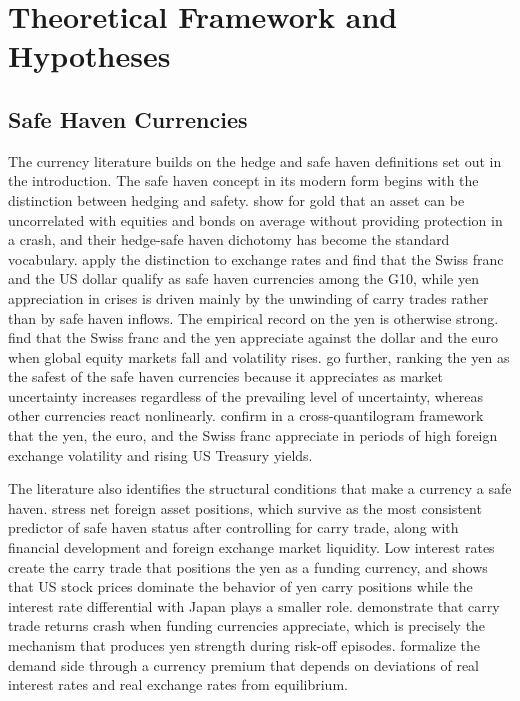 \section{Theoretical Framework and Hypotheses}

\subsection{Safe Haven Currencies}

The currency literature builds on the hedge and safe haven definitions set out in the introduction. The safe haven concept in its modern form begins with the distinction between hedging and safety. \textcite{baur_lucey_2010} show for gold that an asset can be uncorrelated with equities and bonds on average without providing protection in a crash, and their hedge-safe haven dichotomy has become the standard vocabulary. \textcite{hossfeld_macdonald_2014} apply the distinction to exchange rates and find that the Swiss franc and the US dollar qualify as safe haven currencies among the G10, while yen appreciation in crises is driven mainly by the unwinding of carry trades rather than by safe haven inflows. The empirical record on the yen is otherwise strong. \textcite{ranaldo_soderlind_2010} find that the Swiss franc and the yen appreciate against the dollar and the euro when global equity markets fall and volatility rises. \textcite{fatum_yamamoto_2015} go further, ranking the yen as the safest of the safe haven currencies because it appreciates as market uncertainty increases regardless of the prevailing level of uncertainty, whereas other currencies react nonlinearly. \textcite{cho_han_2021} confirm in a cross-quantilogram framework that the yen, the euro, and the Swiss franc appreciate in periods of high foreign exchange volatility and rising US Treasury yields.

The literature also identifies the structural conditions that make a currency a safe haven. \textcite{habib_stracca_2012} stress net foreign asset positions, which survive as the most consistent predictor of safe haven status after controlling for carry trade, along with financial development and foreign exchange market liquidity. Low interest rates create the carry trade that positions the yen as a funding currency, and \textcite{nishigaki_2007} shows that US stock prices dominate the behavior of yen carry positions while the interest rate differential with Japan plays a smaller role. \textcite{brunnermeier_2009} demonstrate that carry trade returns crash when funding currencies appreciate, which is precisely the mechanism that produces yen strength during risk-off episodes. \textcite{imakubo_kamada_kan_2015} formalize the demand side through a currency premium that depends on deviations of real interest rates and real exchange rates from equilibrium.


